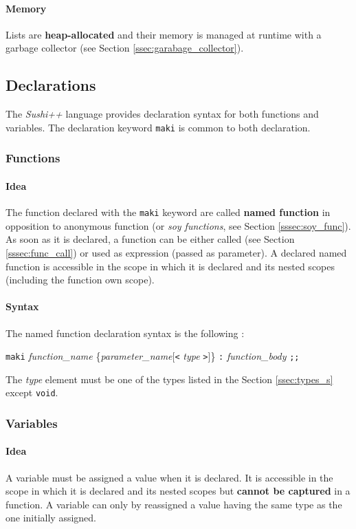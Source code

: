 \documentclass[a4paper,11pt]{article}
\begin{document}
\paragraph{Memory} Lists are \textbf{heap-allocated} and their memory is managed at runtime with a garbage collector (see Section \ref{ssec:garabage_collector}).

\subsection{Declarations}

The \textit{Sushi++} language provides declaration syntax for both functions and variables. The declaration keyword \texttt{maki} is common to both declaration.

\subsubsection{Functions}
\label{sssec:decl_func}
\paragraph{Idea} The function declared with the \texttt{maki} keyword are called \textbf{named function} in opposition to anonymous function (or \textit{soy functions}, see Section \ref{sssec:soy_func}). As soon as it is declared, a function can be either called (see Section \ref{sssec:func_call}) or used as expression (passed as parameter). A declared named function is accessible in the scope in which it is declared and its nested scopes (including the function own scope).
\paragraph{Syntax}  The named function declaration syntax is the following :
\begin{center}
\texttt{maki} \textit{function\_name} \{\textit{parameter\_name}[\texttt{<} \textit{type} \texttt{>}]\} \texttt{:} \textit{function\_body} \texttt{;;}
\end{center}
The \textit{type} element must be one of the types listed in the Section \ref{ssec:types_s} except \texttt{void}.
\subsubsection{Variables}
\paragraph{Idea} A variable must be assigned a value when it is declared. It is accessible in the scope in which it is declared and its nested scopes but \textbf{cannot be captured} in a function. A variable can only by reassigned a value having the same type as the one initially assigned.
\end{document}
